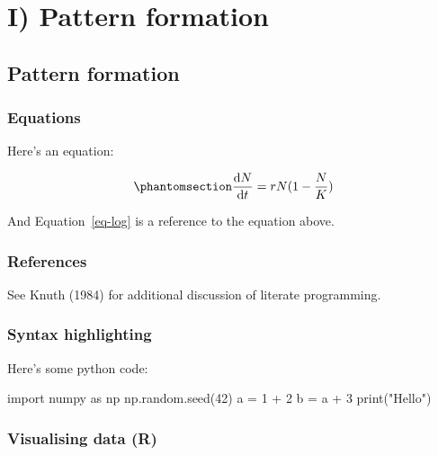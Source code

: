 \documentclass[
  letterpaper,
  DIV=11,
  numbers=noendperiod]{scrreprt}
\newenvironment{Shaded}{\begin{snugshade}}{\end{snugshade}}
\newcommand{\BuiltInTok}[1]{\textcolor[rgb]{0.00,0.23,0.31}{#1}}
\newcommand{\DecValTok}[1]{\textcolor[rgb]{0.68,0.00,0.00}{#1}}
\newcommand{\ImportTok}[1]{\textcolor[rgb]{0.00,0.46,0.62}{#1}}
\newcommand{\NormalTok}[1]{\textcolor[rgb]{0.00,0.23,0.31}{#1}}
\newcommand{\OperatorTok}[1]{\textcolor[rgb]{0.37,0.37,0.37}{#1}}
\newcommand{\StringTok}[1]{\textcolor[rgb]{0.13,0.47,0.30}{#1}}
\theoremstyle{definition}
\theoremstyle{remark}
\begin{document}
\part{I) Pattern formation}

\chapter{Pattern formation}\label{pattern-formation}

\section{Equations}\label{equations-1}

Here's an equation:

\begin{equation}\phantomsection\label{eq-log}{ 
\frac{\mathrm{d}N}{\mathrm{d}t} = rN(1 - \frac{N}{K}) 
}\end{equation}

And Equation~\ref{eq-log} is a reference to the equation above.

\section{References}\label{references-1}

See Knuth (1984) for additional discussion of literate programming.

\section{Syntax highlighting}\label{syntax-highlighting-1}

Here's some python code:

\begin{Shaded}
\begin{Highlighting}[]
\ImportTok{import}\NormalTok{ numpy }\ImportTok{as}\NormalTok{ np}
\NormalTok{np.random.seed(}\DecValTok{42}\NormalTok{)}
\NormalTok{a }\OperatorTok{=} \DecValTok{1} \OperatorTok{+} \DecValTok{2}
\NormalTok{b }\OperatorTok{=}\NormalTok{ a }\OperatorTok{+} \DecValTok{3}
\BuiltInTok{print}\NormalTok{(}\StringTok{"Hello"}\NormalTok{)}
\end{Highlighting}
\end{Shaded}

\section{Visualising data (R)}\label{visualising-data-r-1}
\end{document}

